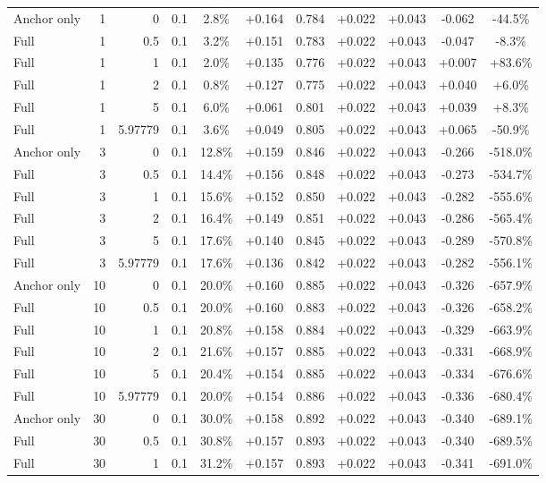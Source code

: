 \begin{table}[htbp]
\begin{tabular}{lrrrccccccc}
Anchor only & 1 & 0 & 0.1 & 2.8\% & +0.164 & 0.784 & +0.022 & +0.043 & -0.062 & -44.5\% \\
Full & 1 & 0.5 & 0.1 & 3.2\% & +0.151 & 0.783 & +0.022 & +0.043 & -0.047 & -8.3\% \\
Full & 1 & 1 & 0.1 & 2.0\% & +0.135 & 0.776 & +0.022 & +0.043 & +0.007 & +83.6\% \\
Full & 1 & 2 & 0.1 & 0.8\% & +0.127 & 0.775 & +0.022 & +0.043 & +0.040 & +6.0\% \\
Full & 1 & 5 & 0.1 & 6.0\% & +0.061 & 0.801 & +0.022 & +0.043 & +0.039 & +8.3\% \\
Full & 1 & 5.97779 & 0.1 & 3.6\% & +0.049 & 0.805 & +0.022 & +0.043 & +0.065 & -50.9\% \\
Anchor only & 3 & 0 & 0.1 & 12.8\% & +0.159 & 0.846 & +0.022 & +0.043 & -0.266 & -518.0\% \\
Full & 3 & 0.5 & 0.1 & 14.4\% & +0.156 & 0.848 & +0.022 & +0.043 & -0.273 & -534.7\% \\
Full & 3 & 1 & 0.1 & 15.6\% & +0.152 & 0.850 & +0.022 & +0.043 & -0.282 & -555.6\% \\
Full & 3 & 2 & 0.1 & 16.4\% & +0.149 & 0.851 & +0.022 & +0.043 & -0.286 & -565.4\% \\
Full & 3 & 5 & 0.1 & 17.6\% & +0.140 & 0.845 & +0.022 & +0.043 & -0.289 & -570.8\% \\
Full & 3 & 5.97779 & 0.1 & 17.6\% & +0.136 & 0.842 & +0.022 & +0.043 & -0.282 & -556.1\% \\
Anchor only & 10 & 0 & 0.1 & 20.0\% & +0.160 & 0.885 & +0.022 & +0.043 & -0.326 & -657.9\% \\
Full & 10 & 0.5 & 0.1 & 20.0\% & +0.160 & 0.883 & +0.022 & +0.043 & -0.326 & -658.2\% \\
Full & 10 & 1 & 0.1 & 20.8\% & +0.158 & 0.884 & +0.022 & +0.043 & -0.329 & -663.9\% \\
Full & 10 & 2 & 0.1 & 21.6\% & +0.157 & 0.885 & +0.022 & +0.043 & -0.331 & -668.9\% \\
Full & 10 & 5 & 0.1 & 20.4\% & +0.154 & 0.885 & +0.022 & +0.043 & -0.334 & -676.6\% \\
Full & 10 & 5.97779 & 0.1 & 20.0\% & +0.154 & 0.886 & +0.022 & +0.043 & -0.336 & -680.4\% \\
Anchor only & 30 & 0 & 0.1 & 30.0\% & +0.158 & 0.892 & +0.022 & +0.043 & -0.340 & -689.1\% \\
Full & 30 & 0.5 & 0.1 & 30.8\% & +0.157 & 0.893 & +0.022 & +0.043 & -0.340 & -689.5\% \\
Full & 30 & 1 & 0.1 & 31.2\% & +0.157 & 0.893 & +0.022 & +0.043 & -0.341 & -691.0\% \\

\end{tabular}
\end{table}
